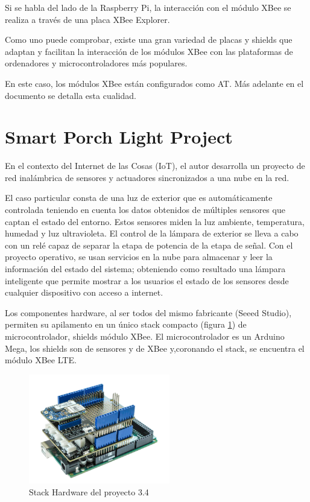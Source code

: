 Si se habla del lado de la Raspberry Pi, la interacción con el módulo XBee se realiza a través de una placa XBee Explorer.

Como uno puede comprobar, existe una gran variedad de placas y shields que adaptan y facilitan la interacción de los módulos XBee con las plataformas de ordenadores y microcontroladores más populares.

En este caso, los módulos XBee están configurados como AT. Más adelante en el documento se detalla esta cualidad.

\section{Smart Porch Light Project \cite{SPLP:MOUSER}}

En el contexto del Internet de las Cosas (IoT), el autor desarrolla un proyecto de red inalámbrica de sensores y actuadores sincronizados a una nube en la red.

El caso particular consta de una luz de exterior que es automáticamente controlada teniendo en cuenta los datos obtenidos de múltiples sensores que captan el estado del entorno. Estos sensores miden la luz ambiente, temperatura, humedad y luz ultravioleta. El control de la lámpara de exterior se lleva a cabo con un relé capaz de separar la etapa de potencia de la etapa de señal. Con el proyecto operativo, se usan servicios en la nube para almacenar y leer la información del estado del sistema; obteniendo como resultado una lámpara inteligente que permite mostrar a los usuarios el estado de los sensores desde cualquier dispositivo con acceso a internet.

Los componentes hardware, al ser todos del mismo fabricante (Seeed Studio), permiten su apilamento en un único stack compacto (figura \ref{fig:EArte4}) de microcontrolador, shields módulo XBee. El microcontrolador es un Arduino Mega, los shields son de sensores y de XBee y,coronando el stack, se encuentra el módulo XBee LTE.

\begin{figure}[t]
\centering
\includegraphics[width=0.55\textwidth]{figuras/EArte4.png}
\caption{Stack Hardware del proyecto 3.4}
\label{fig:EArte4}
\end{figure}

